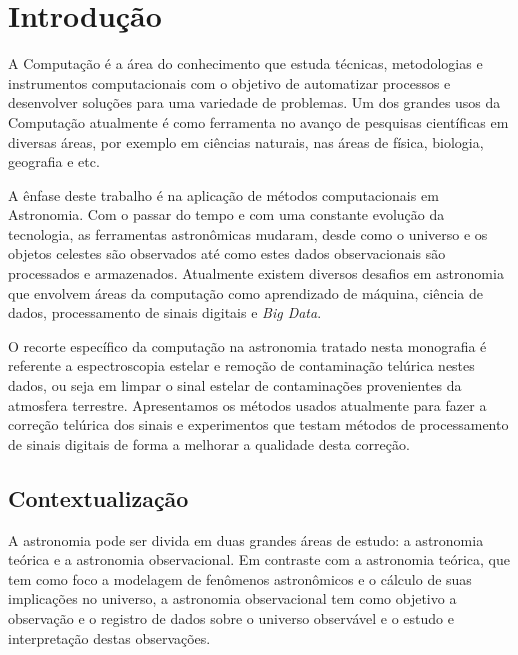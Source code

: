 \chapter{Introdução}
\label{cap:introducao}

A Computação é a área do conhecimento que estuda técnicas, metodologias e instrumentos computacionais com o objetivo de automatizar processos e desenvolver soluções para uma variedade de problemas. Um dos grandes usos da Computação atualmente é como ferramenta no avanço de pesquisas científicas em diversas áreas, por exemplo em ciências naturais, nas áreas de física, biologia, geografia e etc.

A ênfase deste trabalho é na aplicação de métodos computacionais em Astronomia. Com o passar do tempo e com uma constante evolução da tecnologia, as ferramentas astronômicas mudaram, desde como o universo e os objetos celestes são observados até como estes dados observacionais são processados e armazenados. Atualmente existem diversos desafios em astronomia que envolvem áreas da computação como aprendizado de máquina, ciência de dados, processamento de sinais digitais e \textit{Big Data}. 

O recorte específico da computação na astronomia tratado nesta monografia é referente a espectroscopia estelar e remoção de contaminação telúrica nestes dados, ou seja em limpar o sinal estelar de contaminações provenientes da atmosfera terrestre. Apresentamos os métodos usados atualmente para fazer a correção telúrica dos sinais e experimentos que testam métodos de processamento de sinais digitais de forma a melhorar a qualidade desta correção.

\section{Contextualização}

A astronomia pode ser divida em duas grandes áreas de estudo: a astronomia teórica e a astronomia observacional. Em contraste com a astronomia teórica, que tem como foco a modelagem de fenômenos astronômicos e o cálculo de suas implicações no universo, a astronomia observacional tem como objetivo a observação e o registro de dados sobre o universo observável e o estudo e interpretação destas observações.  

